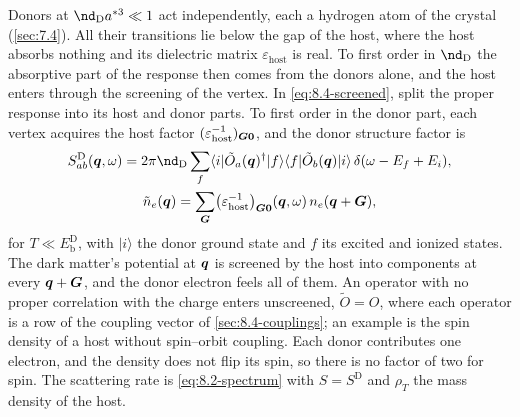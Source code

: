 Donors at $\nd_{\mathrm{D}}a^{*3} \ll 1$ act independently, each a hydrogen atom of the crystal (\cref{sec:7.4}). All their transitions lie below the gap of the host, where the host absorbs nothing and its dielectric matrix $\varepsilon_{\mathrm{host}}$ is real. To first order in $\nd_{\mathrm{D}}$ the absorptive part of the response then comes from the donors alone, and the host enters through the screening of the vertex. In \cref{eq:8.4-screened}, split the proper response into its host and donor parts. To first order in the donor part, each vertex acquires the host factor $(\varepsilon_{\mathrm{host}}^{-1})_{\bm{G}\bm{0}}$, and the donor structure factor is
\begin{equation}
  \begin{gathered}
  S^{\mathrm{D}}_{ab}(\vect{q},\omega) = 2\pi\nd_{\mathrm{D}}\sum_f\langle i|\tilde O_a(\vect{q})^\dagger|f\rangle\langle f|\tilde O_b(\vect{q})|i\rangle\,\delta(\omega - E_f + E_i) , \\
  \tilde n_e(\vect{q}) = \sum_{\vect{G}}\bigl(\varepsilon_{\mathrm{host}}^{-1}\bigr)_{\vect{G}\vect{0}}(\vect{q},\omega)\,n_e(\vect{q} + \vect{G}) ,
  \end{gathered}
  \label{eq:16.5-SD}
\end{equation}
for $T \ll E_{\mathrm{b}}^{\mathrm{D}}$, with $|i\rangle$ the donor ground state and $f$ its excited and ionized states. The dark matter's potential at $\bm{q}$ is screened by the host into components at every $\bm{q} + \bm{G}$, and the donor electron feels all of them. An operator with no proper correlation with the charge enters unscreened, $\tilde O = O$, where each operator is a row of the coupling vector of \cref{sec:8.4-couplings}; an example is the spin density of a host without spin--orbit coupling. Each donor contributes one electron, and the density does not flip its spin, so there is no factor of two for spin. The scattering rate is \cref{eq:8.2-spectrum} with $S = S^{\mathrm{D}}$ and $\rho_T$ the mass density of the host.

